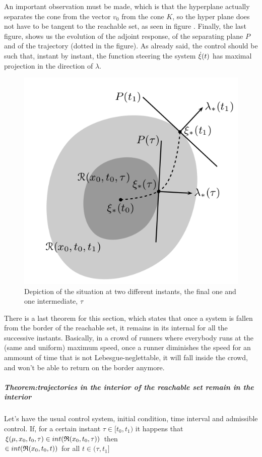 An important observation must be made, which is that the hyperplane actually separates the cone from the vector $v_0$ from the cone $K$, so the hyper plane does not have to be tangent to the reachable set, as seen in figure . %
Finally, the last figure, shows us the evolution of the adjoint response, of the separating plane $P$ and of the trajectory (dotted in the figure). As already said, the control should be such that, instant by instant, the function steering the system $\dot{\xi}(t)$ has maximal projection in the direction of $\lambda$.
\begin{figure}[h!]
	\includegraphics[width=\linewidth]{imgs/5-3-R.png}
	\caption{Depiction of the situation at two different instants, the final one and one intermediate, $\tau$}
\end{figure}
There is a last theorem for this section, which states that once a system is fallen from the border of the reachable set, it remains in its internal for all the successive instants. Basically, in a crowd of runners where everybody runs at the (same and uniform) maximum speed, once a runner diminishes the speed for an ammount of time that is not Lebesgue-neglettable, it will fall inside the crowd, and won't be able to return on the border anymore. 

\subparagraph[5.17]{Theorem:trajectories in the interior of the reachable set remain in the interior} Let's have the usual control system, initial condition, time interval and admissible control. If, for a certain instant $\tau\in[t_0,t_1)$ it happens that $\xi(\mu,x_0,t_0,\tau)\in int(\mathfrak{R}(x_0,t_0,\tau))$ then\\
$\in int(\mathfrak{R}(x_0,t_0,t))$ for all $t\in(\tau,t_1]$



